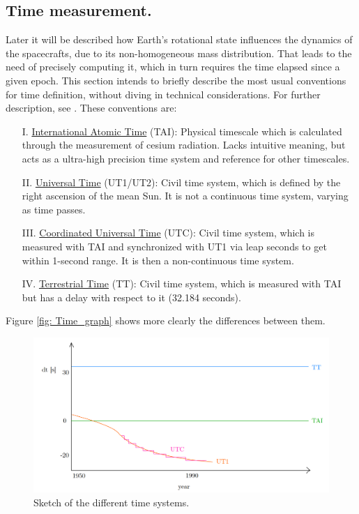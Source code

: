 	\subsection{Time measurement.}
	\indent Later it will be described how Earth's rotational state influences the dynamics of the spacecrafts, due to its non-homogeneous mass distribution. That leads to the need of precisely computing it, which in turn requires the time elapsed since a given epoch. This section intends to briefly describe the most usual conventions for time definition, without diving in technical considerations. For further description, see \cite{Time_handbook}. These conventions are:%
	\begin{itemize}
	\item[I.] \underline{International Atomic Time} (TAI): Physical timescale which is calculated through the measurement of cesium radiation. Lacks intuitive meaning, but acts as a ultra-high precision time system and reference for other timescales.
	\item[II.] \underline{Universal Time} (UT1/UT2): Civil time system, which is defined by the right ascension of the mean Sun. It is not a continuous time system, varying as time passes.  
	\item[III.] \underline{Coordinated Universal Time} (UTC): Civil time system, which is measured with TAI and synchronized with UT1 via leap seconds to get within 1-second range. It is then a non-continuous time system.
	\item[IV.] \underline{Terrestrial Time} (TT): Civil time system, which is measured with TAI but has a delay with respect to it (32.184 seconds).
	\end{itemize}
	\indent Figure \ref{fig:	Time_graph} shows more clearly the differences between them.
	\begin{figure}[!htb]
	\centering\includegraphics[width = 0.6\linewidth]{Appendices/Appendix_B/Time_graph}
	\caption{Sketch of the different time systems.}
	\label{fig:	Time_graph}
	\end{figure}
	\FloatBarrier
% 
